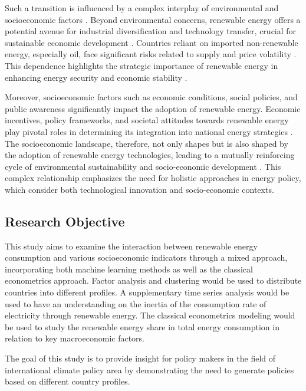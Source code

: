 \documentclass[a4paper,11pt]{article}
\begin{document}
Such a transition is influenced by a complex interplay of environmental and socioeconomic factors \parencite{ref19}.
Beyond environmental concerns, renewable energy offers a potential avenue for industrial diversification and technology transfer, crucial for sustainable economic development \parencite{ref27}.
Countries reliant on imported non-renewable energy, especially oil, face significant risks related to supply and price volatility \parencite{ref25}.
This dependence highlights the strategic importance of renewable energy in enhancing energy security and economic stability \parencite{ref2}.

Moreover, socioeconomic factors such as economic conditions, social policies, and public awareness significantly impact the adoption of renewable energy.
Economic incentives, policy frameworks, and societal attitudes towards renewable energy play pivotal roles in determining its integration into national energy strategies \parencite{ref30}.
The socioeconomic landscape, therefore, not only shapes but is also shaped by the adoption of renewable energy technologies, leading to a mutually reinforcing cycle of environmental sustainability and socio-economic development \parencite{ref19}.
This complex relationship emphasizes the need for holistic approaches in energy policy, which consider both technological innovation and socio-economic contexts.

\subsection{Research Objective}
This study aims to examine the interaction between renewable energy consumption and various socioeconomic indicators through a mixed approach, incorporating both machine learning methods as well as the classical econometrics approach.
Factor analysis and clustering would be used to distribute countries into different profiles.
A supplementary time series analysis would be used to have an understanding on the inertia of the consumption rate of electricity through renewable energy.
The classical econometrics modeling would be used to study the renewable energy share in total energy consumption in relation to key macroeconomic factors.

The goal of this study is to provide insight for policy makers in the field of international climate policy area by demonstrating the need to generate policies based on different country profiles.

\end{document}

